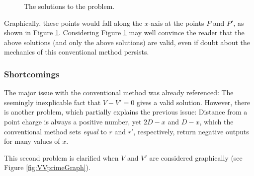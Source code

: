 \documentclass[titlepage]{article}
\begin{document}
\begin{figure}[H]
    \centering
    \caption{The solutions to the problem.}
    \label{fig:2points}
\end{figure}

Graphically, these points would fall along the $x$-axis at the points $P$ and $P'$, as shown in Figure \ref{fig:2points}. Considering Figure \ref{fig:2points} may well convince the reader that the above solutions (and only the above solutions) are valid, even if doubt about the mechanics of this conventional method persists.

\subsubsection*{Shortcomings}
The major issue with the conventional method was already referenced: The seemingly inexplicable fact that $V-V'=0$ gives a valid solution. However, there is another problem, which partially explains the previous issue: Distance from a point charge is always a positive number, yet $2D-x$ and $D-x$, which the conventional method sets \emph{equal} to $r$ and $r'$, respectively, return negative outputs for many values of $x$.\par
This second problem is clarified when $V$ and $V'$ are considered graphically (see Figure \ref{fig:VVprimeGraph}).
\end{document}
